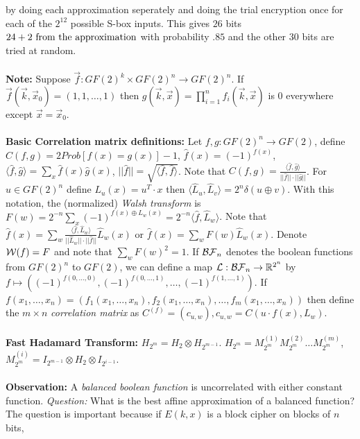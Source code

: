 by doing each approximation seperately and doing the trial encryption once for each
of the $2^{12}$ possible S-box inputs.  
This gives $26$ bits $24 + 2 \textnormal{ from the approximation}$ 
with probability $.85$ and the other $30$ bits
are tried at random.
\\
\\
{\bf Note: } Suppose ${\vec f}: GF(2)^k \times GF(2)^n \rightarrow GF(2)^n$.
If ${\vec f}({\vec k}, {\vec x}_0)= (1,1, \ldots, 1)$ then
$g({\vec k}, {\vec x})= \prod_{i=1}^n f_i({\vec k}, {\vec x})$ is $0$ everywhere except
${\vec x}= {\vec x}_0$.
\\
\\
{\bf Basic Correlation matrix definitions: }
Let $f,g: GF(2)^n \rightarrow GF(2)$, define
$C(f,g)= 2 Prob[f(x)=g(x)] -1$, $\hat{f}(x) = (-1)^{f(x)}$,
$\langle \hat{f}, \hat{g} \rangle = \sum_x \hat{f}(x) \hat{g}(x) $,
$|| \hat{f}||= \sqrt{\langle \hat{f}, \hat{f} \rangle}$.  Note that
$C(f,g)= {\frac {\langle \hat{f}, \hat{g} \rangle} {||\hat{f}|| \cdot ||\hat{g}||}}$.
For $u \in GF(2)^n$ define $L_u(x)= u^T \cdot x$ then 
$\langle \hat{L}_u , \hat{L}_v \rangle= 2^n \delta (u \oplus v)$.
With this notation, the (normalized) \emph{Walsh transform} is
$F(w)= 2^{-n} \sum_x (-1)^{f(x) \oplus L_w(x)} = 
2^{-n} \langle \hat{f}, \hat{L}_w \rangle$.
Note that 
$\hat{f}(x)= \sum_w {\frac {\langle \hat{f}, \hat{L}_w \rangle} 
{||\hat{L}_w|| \cdot ||\hat{f}||}} \hat{L}_w(x)$ or
$\hat{f}(x)= \sum_w F(w) \hat{L}_w(x)$.  Denote ${\cal W}(f)= F$ and note that
$\sum_w F(w)^2 =1$.  If ${\cal BF}_n$ denotes the boolean functions from
$GF(2)^n$ to $GF(2)$,  we can define a map 
${\cal L}: {\cal BF}_n \rightarrow {\mathbb R}^{2^n}$ by $f \mapsto 
( (-1)^{f(0,\ldots, 0)},
(-1)^{f(0,\ldots, 1)}, \ldots,
(-1)^{f(1,\ldots, 1)})$.
If 
$f(x_1, \ldots, x_n) = (f_1(x_1, \ldots, x_n), f_2(x_1, \ldots, x_n), \ldots, 
f_m(x_1, \ldots, x_n)) $
then define the $m \times n$ \emph{correlation matrix} as $C^{(f)}= (c_{u,w}), 
c_{u,w}= C(u \cdot f(x), L_w)$.
\\
\\
{\bf Fast Hadamard Transform: }
$H_{2^m} = H_2 \otimes H_{2^{m-1}}$.
$H_{2^m}= M^{(1)}_{2^m} M^{(2)}_{2^m} \ldots M^{(m)}_{2^m}$,
$M^{(i)}_{2^m}= I_{2^{m-1}} \otimes H_2 \otimes I_{2^{i-1}}$.
\\
\\
{\bf Observation: }
A \emph{balanced boolean function} is uncorrelated with either constant function.
\emph{Question: } What is the best affine approximation of a balanced function?
The question is important because if $E(k,x)$ is a block cipher on blocks of $n$ bits, 
